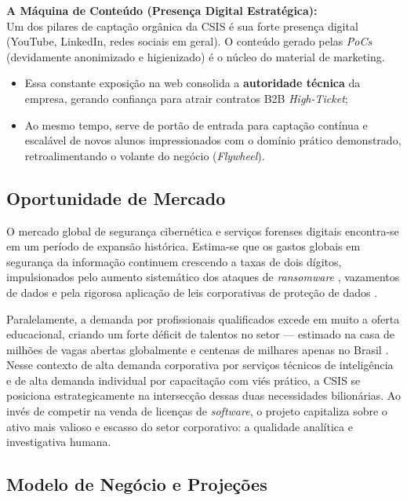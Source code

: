 \documentclass[../main.tex]{subfiles}
\begin{document}
\textbf{A Máquina de Conteúdo (Presença Digital Estratégica):}\\
Um dos pilares de captação orgânica da CSIS é sua forte presença digital (YouTube, LinkedIn, redes sociais em geral). O conteúdo gerado pelas \textit{PoCs} (devidamente anonimizado e higienizado) é o núcleo do material de marketing.
\begin{itemize}
  \item Essa constante exposição na web consolida a \textbf{autoridade técnica} da empresa, gerando confiança para atrair contratos B2B \textit{High-Ticket};
  \item Ao mesmo tempo, serve de portão de entrada para captação contínua e escalável de novos alunos impressionados com o domínio prático demonstrado, retroalimentando o volante do negócio (\textit{Flywheel}).
\end{itemize}

\subsection{Oportunidade de Mercado}

O mercado global de segurança cibernética e serviços forenses digitais encontra-se em um período de expansão histórica. Estima-se que os gastos globais em segurança da informação continuem crescendo a taxas de dois dígitos, impulsionados pelo aumento sistemático dos ataques de \textit{ransomware} \citep{ransomware_trends}, vazamentos de dados e pela rigorosa aplicação de leis corporativas de proteção de dados \citep{cyber_market_global}.

Paralelamente, a demanda por profissionais qualificados excede em muito a oferta educacional, criando um forte déficit de talentos no setor — estimado na casa de milhões de vagas abertas globalmente e centenas de milhares apenas no Brasil \citep{cyber_skills_gap_br}. Nesse contexto de alta demanda corporativa por serviços técnicos de inteligência e de alta demanda individual por capacitação com viés prático, a CSIS se posiciona estrategicamente na intersecção dessas duas necessidades bilionárias. Ao invés de competir na venda de licenças de \textit{software}, o projeto capitaliza sobre o ativo mais valioso e escasso do setor corporativo: a qualidade analítica e investigativa humana.

\subsection{Modelo de Negócio e Projeções}
\end{document}
